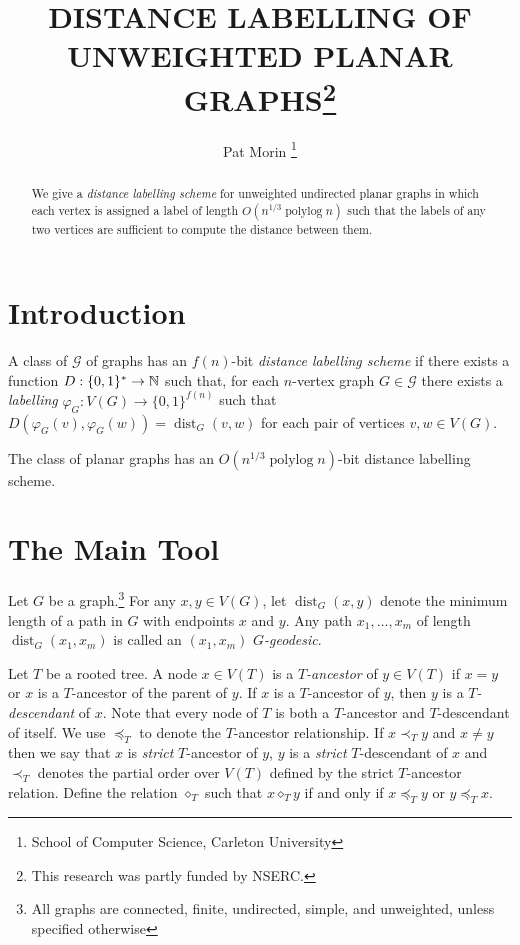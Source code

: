\documentclass{patmorin}
\title{\MakeUppercase{Distance Labelling of Unweighted Planar Graphs}\thanks{This research was partly funded by NSERC.}}
\author{Pat Morin%
    \thanks{School of Computer Science, Carleton University}}
\DeclareMathOperator{\dist}{dist}
\DeclareMathOperator{\polylog}{polylog}
\newcommand{\comparable}{\mathbin{\diamond}}
\begin{document}
\maketitle

\begin{abstract}
    We give a \emph{distance labelling scheme} for unweighted undirected planar graphs in which each vertex is assigned a label of length $O(n^{1/3}\polylog n)$ such that the labels of any two vertices are sufficient to compute the distance between them.
\end{abstract}

\section{Introduction}

A class of $\mathcal{G}$ of graphs has an $f(n)$-bit \emph{distance labelling scheme} if there exists a function $D:\{0,1\}^*\to\mathbb{N}$ such that, for each $n$-vertex graph $G\in\mathcal{G}$ there exists a \emph{labelling} $\varphi_G:V(G)\to\{0,1\}^{f(n)}$ such that $D(\varphi_G(v),\varphi_G(w)) = \dist_G(v,w)$ for each pair of vertices $v,w\in V(G)$.

\begin{thm}\label{main}
    The class of planar graphs has an $O(n^{1/3}\polylog n)$-bit distance labelling scheme.
\end{thm}

\section{The Main Tool}
\label{main_tool}

Let $G$ be a graph.\footnote{All graphs are connected, finite, undirected, simple, and unweighted, unless specified otherwise}  For any $x,y\in V(G)$, let $\dist_G(x,y)$ denote the minimum length of a path in $G$ with endpoints $x$ and $y$.  Any path $x_1,\ldots,x_m$ of length $\dist_G(x_1,x_m)$ is called an $(x_1,x_m)$ \emph{$G$-geodesic}.

Let $T$ be a rooted tree.  A node $x\in V(T)$ is a \emph{$T$-ancestor} of $y\in V(T)$ if $x=y$ or $x$ is a $T$-ancestor of the parent of $y$.  If $x$ is a $T$-ancestor of $y$, then $y$ is a \emph{$T$-descendant} of $x$.  Note that every node of $T$ is both a $T$-ancestor and $T$-descendant of itself.  We use $\preceq_T$ to denote the $T$-ancestor relationship.  If $x\prec_T y$ and $x\neq y$ then we say that $x$ is \emph{strict} $T$-ancestor of $y$, $y$ is a \emph{strict} $T$-descendant of $x$ and $\prec_T$ denotes the partial order over $V(T)$ defined by the strict $T$-ancestor relation.  Define the relation $\comparable_T$ such that $x\comparable_T y$ if and only if $x\preceq_T y$ or $y\preceq_T x$.
\end{document}
